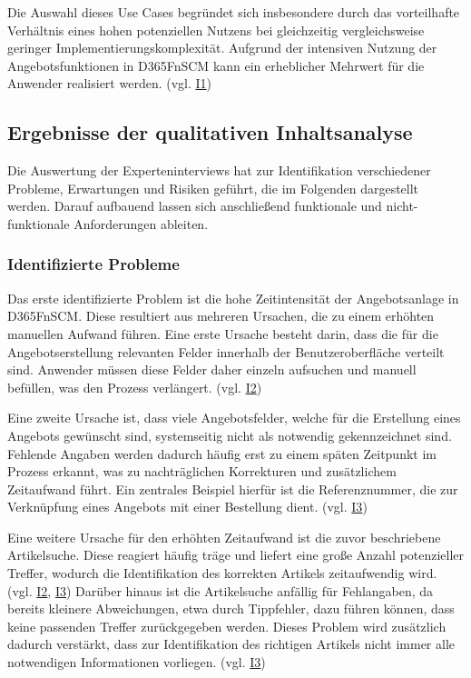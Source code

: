 Die Auswahl dieses Use Cases begründet sich insbesondere durch das vorteilhafte Verhältnis eines hohen potenziellen Nutzens bei gleichzeitig vergleichsweise geringer Implementierungskomplexität. Aufgrund der intensiven Nutzung der Angebotsfunktionen in \ac{D365FnSCM} kann ein erheblicher Mehrwert für die Anwender realisiert werden. (vgl. \hyperref[anhang:i1]{I1})

\subsection{Ergebnisse der qualitativen Inhaltsanalyse}

Die Auswertung der Experteninterviews hat zur Identifikation verschiedener Probleme, Erwartungen und Risiken geführt, die im Folgenden dargestellt werden. Darauf aufbauend lassen sich anschließend funktionale und nicht-funktionale Anforderungen ableiten.

\subsubsection{Identifizierte Probleme}
Das erste identifizierte Problem ist die hohe Zeitintensität der Angebotsanlage in \ac{D365FnSCM}. Diese resultiert aus mehreren Ursachen, die zu einem erhöhten manuellen Aufwand führen. 
Eine erste Ursache besteht darin, dass die für die Angebotserstellung relevanten Felder innerhalb der Benutzeroberfläche verteilt sind. Anwender müssen diese Felder daher einzeln aufsuchen und manuell befüllen, was den Prozess verlängert. (vgl. \hyperref[anhang:i2]{I2})

Eine zweite Ursache ist, dass viele Angebotsfelder, welche für die Erstellung eines Angebots gewünscht sind, systemseitig nicht als notwendig gekennzeichnet sind. Fehlende Angaben werden dadurch häufig erst zu einem späten Zeitpunkt im Prozess erkannt, was zu nachträglichen Korrekturen und zusätzlichem Zeitaufwand führt. Ein zentrales Beispiel hierfür ist die Referenznummer, die zur Verknüpfung eines Angebots mit einer Bestellung dient. (vgl. \hyperref[anhang:i3]{I3})

Eine weitere Ursache für den erhöhten Zeitaufwand ist die zuvor beschriebene Artikelsuche. Diese reagiert häufig träge und liefert eine große Anzahl potenzieller Treffer, wodurch die Identifikation des korrekten Artikels zeitaufwendig wird. (vgl. \hyperref[anhang:i2]{I2}, \hyperref[anhang:i3]{I3}) Darüber hinaus ist die Artikelsuche anfällig für Fehlangaben, da bereits kleinere Abweichungen, etwa durch Tippfehler, dazu führen können, dass keine passenden Treffer zurückgegeben werden. Dieses Problem wird zusätzlich dadurch verstärkt, dass zur Identifikation des richtigen Artikels nicht immer alle notwendigen Informationen vorliegen. (vgl. \hyperref[anhang:i3]{I3})

